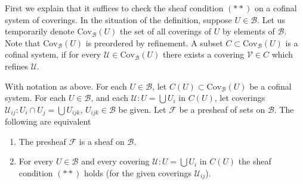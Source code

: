 \noindent
First we explain that it suffices to
check the sheaf condition $(**)$
on a cofinal system of coverings.
In the situation of the definition, suppose
$U \in \mathcal{B}$. Let us temporarily denote
$\text{Cov}_\mathcal{B}(U)$ the set of all coverings
of $U$ by elements of $\mathcal{B}$.
Note that $\text{Cov}_\mathcal{B}(U)$ is preordered by refinement.
A subset $C \subset \text{Cov}_\mathcal{B}(U)$ is a
cofinal system, if for every $\mathcal{U} \in \text{Cov}_\mathcal{B}(U)$
there exists a covering $\mathcal{V} \in C$ which refines $\mathcal{U}$.

\begin{lemma}
\label{lemma-cofinal-systems-coverings}
With notation as above.
For each $U \in \mathcal{B}$, let $C(U) \subset \text{Cov}_\mathcal{B}(U)$
be a cofinal system. For each $U \in \mathcal{B}$, and each
$\mathcal{U} : U = \bigcup U_i$ in $C(U)$, let coverings
$\mathcal{U}_{ij} : U_i \cap U_j = \bigcup U_{ijk}$,
$U_{ijk} \in \mathcal{B}$ be given.
Let $\mathcal{F}$ be a presheaf of sets on $\mathcal{B}$.
The following are equivalent
\begin{enumerate}
\item The presheaf $\mathcal{F}$ is a sheaf on $\mathcal{B}$.
\item For every $U \in \mathcal{B}$ and every covering
$\mathcal{U} : U = \bigcup U_i$ in $C(U)$ the sheaf condition
$(**)$ holds (for the given coverings $\mathcal{U}_{ij}$).
\end{enumerate}
\end{lemma}

